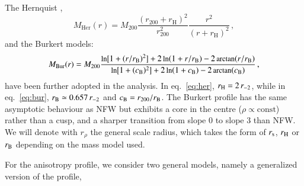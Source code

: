 \documentclass{aa}
\begin{document}
The Hernquist \citep{Hernquist_1990},
    \begin{equation}
         M_\text{Her}(r) = M_{200}\frac{(r_{200}+ r_\text{H})^2}{r_\text{200}^2}\frac{ r^2}{(r+ r_\text{H})^2}\,,\label{eq:her}
    \end{equation}
and the Burkert \citep{Burkert_1995} models:
    \begin{equation}
    \small
         M_\text{Bur}(r) = M_{200}\frac{\text{ln}\big[1+(r/r_\text{B})^2\big] +  2\,\text{ln}(1+r/r_\text{B}) - 2\,\text{arctan}(r/r_\text{B}) }{\text{ln}\big[1+(c_{\rm B})^2\big] +  2\,\text{ln}(1+c_{\rm B}) - 2\,\text{arctan}(c_{\rm B})}\,,\label{eq:bur}
    \end{equation}
have been further adopted in the analysis. In eq.~\eqref{eq:her}, $r_{\rm H} = 2 \, r_{-2}$, while in eq.~\eqref{eq:bur}, $r_{\rm B} \simeq 0.657 \, r_{-2}$ and $c_{\rm B} = r_{200}/r_{\rm B}$. The Burkert profile has the same asymptotic behaviour as NFW but exhibits a core in the centre ($\rho \propto \mathrm{const}$) rather than a cusp, and a sharper transition from slope 0 to slope 3 than NFW. We will denote with $r_\rho$ the general scale radius, which takes the form of $r_{\rm s}$, $r_{\rm H}$ or $r_{\rm B}$ depending on the mass model used.





For the anisotropy profile, we consider two general models, namely a generalized version of the  
\citet[][gT, hereafter]{Tiret+07} profile,
\end{document}
